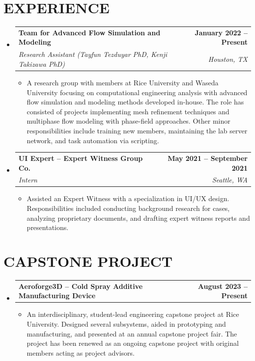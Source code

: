 \documentclass[letterpaper,11pt]{article}
\makeatletter
\newcommand{\resumeItem}[1]{
  \item \small{
    {#1 \vspace{-2pt}}
  }
}
\newcommand{\resumeSubheading}[4]{
  \vspace{-2pt}\item
    \begin{tabular*}{1.0\textwidth}[t]{l@{\extracolsep{\fill}}r}
      \textbf{#1} & \textbf{\small #2} \\
      \textit{\small#3} & \textit{\small #4} \\
    \end{tabular*}\vspace{-7pt}
}
\newcommand{\projectSubheading}[2]{
  \vspace{-2pt}\item
    \begin{tabular*}{1.0\textwidth}[t]{l@{\extracolsep{\fill}}r}
      \textbf{#1} & \textbf{\small #2} \\
    \end{tabular*}\vspace{-7pt}
}
\newcommand{\resumeSubHeadingListStart}{\begin{itemize}[leftmargin=0.0in, label={}]}
\newcommand{\resumeSubHeadingListEnd}{\end{itemize}}
\newcommand{\resumeItemListStart}{\begin{itemize}}
\newcommand{\resumeItemListEnd}{\end{itemize}\vspace{-5pt}}
\makeatother
\begin{document}
\section{EXPERIENCE}
  \resumeSubHeadingListStart

    \resumeSubheading
      {Team for Advanced Flow Simulation and Modeling}{January 2022 -- Present}
      {Research Assistant (Tayfun Tezduyar PhD, Kenji Takizawa PhD)}{Houston, TX}
      \resumeItemListStart
        \resumeItem{A research group with members at Rice University and Waseda University focusing on computational engineering analysis with advanced flow simulation and modeling methods developed in-house. The role has consisted of projects implementing mesh refinement techniques and multiphase flow modeling with phase-field approaches. Other minor responsibilities include training new members, maintaining the lab server network, and task automation via scripting.}
      \resumeItemListEnd   
    \vspace{-12pt}
    \resumeSubheading
      {UI Expert -- Expert Witness Group Co.}{May 2021 -- September 2021}
      {Intern}{Seattle, WA}
      \resumeItemListStart
        \resumeItem{Assisted an Expert Witness with a specialization in UI/UX design. Responsibilities included conducting background research for cases, analyzing proprietary documents, and drafting expert witness reports and presentations.}
      \resumeItemListEnd   
 
    \resumeSubHeadingListEnd
 \vspace{-16pt}

\section{CAPSTONE PROJECT}

    \resumeSubHeadingListStart
      \projectSubheading
        {Aeroforge3D -- Cold Spray Additive Manufacturing Device}{August 2023 -- Present}
        \resumeItemListStart
          \resumeItem{An interdisciplinary, student-lead engineering capstone project at Rice University. Designed several subsystems, aided in prototyping and manufacturing, and presented at an annual capstone project fair. The project has been renewed as an ongoing capstone project with original members acting as project advisors.}
        \resumeItemListEnd   
  \resumeSubHeadingListEnd
\vspace{-16pt}

\end{document}
